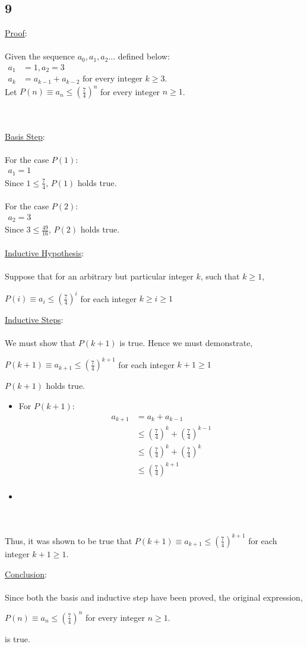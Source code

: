 \documentclass[12pt]{article}
\newcommand{\xlist}[1]{
    \begin{itemize}
        \renewcommand{\labelitemi}{$\centerdot$}
        #1
    \end{itemize}
    \newblock
    \\ \\
}
\newcommand{\xconclusion}[1]{
    \underline{Conclusion}:
    \\ \\
    #1
    \\ \\
}
\newcommand{\xproof}[1]{
    \underline{Proof}:
    \\ \\
    #1
    \\ \\
}
\newcommand{\xbasisstep}{
    \underline{Basis Step}:
    \\ \\
}
\newcommand{\xinductivehypothesis}{
    \underline{Inductive Hypothesis}:
    \\ \\
}
\newcommand{\xinductivestep}{
    \underline{Inductive Steps}:
    \\ \\
}
\begin{document}
\subsection*{9}
\xproof{
    Given the sequence $a_0, a_1, a_2$... defined below:
    \begin{align*}
        a_1 &= 1, a_2 = 3 \hspace{12cm}\\
        a_k &= a_{k-1}+a_{k-2}\text{ for every integer } k \geq 3.
    \end{align*}
    Let $P(n) \equiv a_n \leq \left(\frac{7}{4}\right)^n $ for every integer $n \geq 1$.
}
\xbasisstep
For the case $P(1)$:
\begin{align*}
    a_1 = 1 \hspace{14cm}
\end{align*}
Since $1 \leq \frac{7}{4}$, $P(1)$ holds true.
\\ \\
For the case $P(2)$:
\begin{align*}
    a_2 = 3 \hspace{14cm}
\end{align*}
Since $3 \leq \frac{49}{16}$, $P(2)$ holds true.
\\ \\
\xinductivehypothesis
Suppose that for an arbitrary but particular integer $k$, such that $k \geq 1$,
\begin{center}
    $P(i) \equiv a_i \leq \left(\frac{7}{4}\right)^i $ for each integer $k \geq i \geq 1$
\end{center}
\xinductivestep
We must show that $P(k+1)$ is true. Hence we must demonstrate,
\begin{center}
    $P(k+1) \equiv a_{k+1} \leq \left(\frac{7}{4}\right)^{k+1}$ for each integer $k + 1 \geq 1$
\end{center}
$P(k+1)$ holds true.
\xlist{
    \item For $P(k+1)$:
    \begin{align*}
        a_{k+1} &= a_k + a_{k-1} \\
        &\leq \left(\frac{7}{4}\right)^k + \left(\frac{7}{4}\right)^{k-1} \\
        &\leq \left(\frac{7}{4}\right)^k + \left(\frac{7}{4}\right)^k \\
        &\leq \left(\frac{7}{4}\right)^{k+1}\\
    \end{align*}
    \item 
}
Thus, it was shown to be true that $P(k+1) \equiv a_{k+1} \leq \left(\frac{7}{4}\right)^{k+1}$ for each integer $k + 1 \geq 1$.
\xconclusion{
    Since both the basis and inductive step have been proved, the original expression,
    \begin{center}
        $P(n) \equiv a_n \leq \left(\frac{7}{4}\right)^n $ for every integer $n \geq 1$.
    \end{center}
    is true.
}
\end{document}
